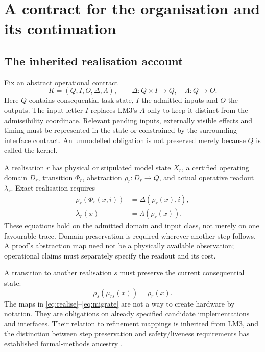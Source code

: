 \section{A contract for the organisation and its continuation}
\label{sec:contract}

\subsection{The inherited realisation account}

Fix an abstract operational contract
\begin{equation}
K=(Q,I,O,\Delta,\Lambda),\qquad
\Delta:Q\times I\to Q,\quad \Lambda:Q\to O.
\label{eq:kernel}
\end{equation}
Here \(Q\) contains consequential task state, \(I\) the admitted inputs and \(O\) the outputs. The input letter \(I\) replaces LM3's \(A\) only to keep it distinct from the admissibility coordinate. Relevant pending inputs, externally visible effects and timing must be represented in the state or constrained by the surrounding interface contract. An unmodelled obligation is not preserved merely because \(Q\) is called the kernel.

A realisation \(r\) has physical or stipulated model state \(X_r\), a certified operating domain \(D_r\), transition \(\Phi_r\), abstraction \(\rho_r:D_r\to Q\), and actual operative readout \(\lambda_r\). Exact realisation requires
\begin{align}
\rho_r(\Phi_r(x,i))&=\Delta(\rho_r(x),i),\label{eq:realise}\\
\lambda_r(x)&=\Lambda(\rho_r(x)).\label{eq:readout}
\end{align}
These equations hold on the admitted domain and input class, not merely on one favourable trace. Domain preservation is required wherever another step follows. A proof's abstraction map need not be a physically available observation; operational claims must separately specify the readout and its cost.

A transition to another realisation \(s\) must preserve the current consequential state:
\begin{equation}
\rho_s(\mu_{rs}(x))=\rho_r(x).
\label{eq:migrate}
\end{equation}
The maps in \eqref{eq:realise}--\eqref{eq:migrate} are not a way to create hardware by notation. They are obligations on already specified candidate implementations and interfaces. Their relation to refinement mappings is inherited from LM3, and the distinction between step preservation and safety/liveness requirements has established formal-methods ancestry \cite[\S\S6,14]{LM3}\cite{AL}.

